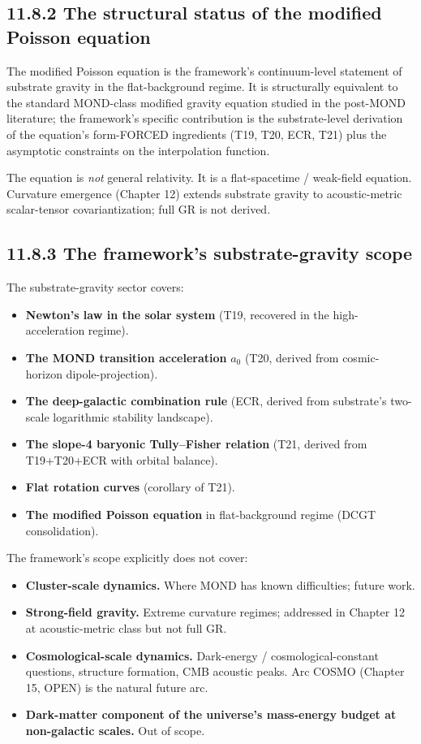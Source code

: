 \documentclass[11pt]{book}
\begin{document}
\subsection{11.8.2 The structural status of the modified Poisson equation}

The modified Poisson equation is the framework's continuum-level statement of substrate gravity in the flat-background regime. It is structurally equivalent to the standard MOND-class modified gravity equation studied in the post-MOND literature; the framework's specific contribution is the substrate-level derivation of the equation's form-FORCED ingredients (T19, T20, ECR, T21) plus the asymptotic constraints on the interpolation function.

The equation is \textit{not} general relativity. It is a flat-spacetime / weak-field equation. Curvature emergence (Chapter 12) extends substrate gravity to acoustic-metric scalar-tensor covariantization; full GR is not derived.

\subsection{11.8.3 The framework's substrate-gravity scope}

The substrate-gravity sector covers:
\begin{itemize}
\item \textbf{Newton's law in the solar system} (T19, recovered in the high-acceleration regime).
\item \textbf{The MOND transition acceleration} $a_0$ (T20, derived from cosmic-horizon dipole-projection).
\item \textbf{The deep-galactic combination rule} (ECR, derived from substrate's two-scale logarithmic stability landscape).
\item \textbf{The slope-4 baryonic Tully–Fisher relation} (T21, derived from T19+T20+ECR with orbital balance).
\item \textbf{Flat rotation curves} (corollary of T21).
\item \textbf{The modified Poisson equation} in flat-background regime (DCGT consolidation).
\end{itemize}

The framework's scope explicitly does not cover:
\begin{itemize}
\item \textbf{Cluster-scale dynamics.} Where MOND has known difficulties; future work.
\item \textbf{Strong-field gravity.} Extreme curvature regimes; addressed in Chapter 12 at acoustic-metric class but not full GR.
\item \textbf{Cosmological-scale dynamics.} Dark-energy / cosmological-constant questions, structure formation, CMB acoustic peaks. Arc COSMO (Chapter 15, OPEN) is the natural future arc.
\item \textbf{Dark-matter component of the universe's mass-energy budget at non-galactic scales.} Out of scope.
\end{itemize}
\end{document}
